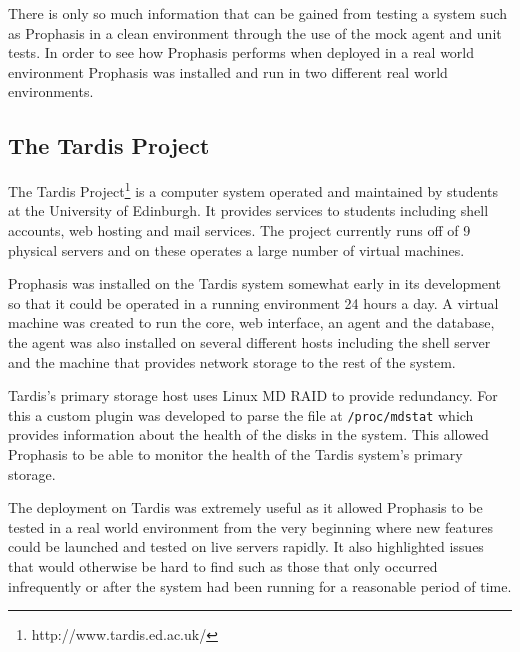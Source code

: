 \documentclass[bsc,deptreport,twoside,parskip,singlespacing,notimes]{infthesis}
\begin{document}
	There is only so much information that can be gained from testing a system such
	as Prophasis in a clean environment through the use of the mock agent and unit
	tests.  In order to see how Prophasis performs when deployed in a real world
	environment Prophasis was installed and run in two different real world
	environments.

\subsection{The Tardis Project}
\label{testing-tardis}

	The Tardis Project\footnote{http://www.tardis.ed.ac.uk/} is a computer system
	operated and maintained by students at the University of Edinburgh.
	It provides services to students including shell accounts, web hosting and mail
	services.  The project currently runs off of 9 physical servers and on these
	operates a large number of virtual machines.


	Prophasis was installed on the Tardis system somewhat early in its development
	so that it could be operated in a running environment 24 hours a day. A virtual
	machine was created to run the core, web interface, an agent and the database,
	the agent was also installed on several different hosts including the shell
	server and the machine that provides network storage to the rest of the system.


	Tardis's primary storage host uses Linux MD RAID to provide redundancy.  For
	this a custom plugin was developed to parse the file at \texttt{/proc/mdstat}
	which provides information about the health of the disks in the system. This
	allowed Prophasis to be able to monitor the health of the Tardis system's
	primary storage.


	The deployment on Tardis was extremely useful as it allowed Prophasis to be
	tested in a real world environment from the very beginning where new features
	could be launched and tested on live servers rapidly.  It also highlighted
	issues that would otherwise be hard to find such as those that only occurred
	infrequently or after the system had been running for a reasonable period of
	time.
\end{document}
